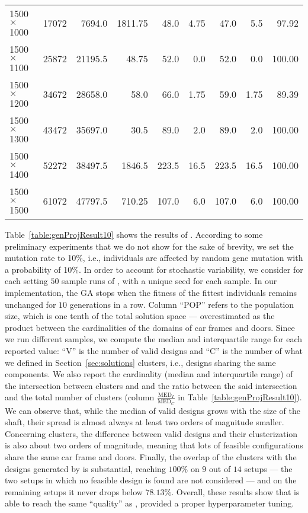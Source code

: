 \begin{table}[t]
\begin{tabular}{l r rr rr rr r}
		1500 $\times$ 1000 & 17072 & 7694.0 & 1811.75 & 48.0 & 4.75 & 47.0 & 5.5 & 97.92\\
		1500 $\times$ 1100 & 25872 & 21195.5 & 48.75 & 52.0 & 0.0 & 52.0 & 0.0 & 100.00\\
		1500 $\times$ 1200 & 34672 & 28658.0 & 58.0 & 66.0 & 1.75 & 59.0 & 1.75 & 89.39\\
		1500 $\times$ 1300 & 43472 & 35697.0 & 30.5 & 89.0 & 2.0 & 89.0 & 2.0 & 100.00\\
		1500 $\times$ 1400 & 52272 & 38497.5 & 1846.5 & 223.5 & 16.5 & 223.5 & 16.5 & 100.00\\
		1500 $\times$ 1500 & 61072 & 47797.5 & 710.25 & 107.0 & 6.0 & 107.0 & 6.0 & 100.00\\
		\bottomrule
	\end{tabular}
\end{table}
%
Table~\ref{table:genProjResult10} shows the results of
\liftcreatega{}. According to some preliminary experiments 
that we do not show for the sake of brevity, we set the mutation rate
to 10\%, i.e., individuals are affected by random gene mutation with a
probability of 10\%. In order to account for stochastic variability,
we consider 
for each setting $50$ sample runs of \liftcreatega{}, with a unique
seed for each sample. In our implementation, the GA stops when the
fitness of the fittest individuals remains unchanged for $10$ 
generations in a row. Column ``POP'' refers to the population size, 
which is one tenth of the total solution space --- overestimated as
the product between the cardinalities of the domains of car frames and
doors. Since we run different samples, we compute the median and
interquartile range 
for each reported value: ``V'' is the number of valid designs and 
``C'' is the number of what we defined in Section~\ref{sec:solutions}
clusters, i.e., designs sharing the same components.
We also report the cardinality (median and interquartile range) of the 
intersection between \liftcreatega{} clusters and \liftcreatehr{} and 
the ratio between the said intersection and the total number of clusters
(column $\frac{\text{MED}_I}{\text{MED}_C}$ in 
Table~\ref{table:genProjResult10}). We can observe that, while the median
of valid designs grows with the size of the shaft, their spread is
almost always at least two orders of magnitude smaller. Concerning 
clusters, the difference between valid designs and their clusterization
is also about two orders of magnitude, meaning that lots of feasible
configurations share the same car frame and doors. Finally, the overlap
of the clusters with the designs generated by \liftcreatehr{} is 
substantial, reaching $100\%$ on $9$ out of $14$ setups --- the two
setups in which no feasible design is found are not considered --- and
on the remaining setups it never drops below $78.13\%$. Overall, these
results show that \liftcreatega{} is able to reach the same ``quality''
as \liftcreatehr{}, provided a proper hyperparameter tuning.

